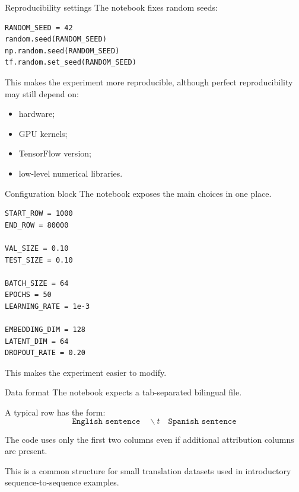 \documentclass[aspectratio=169]{beamer}
\begin{document}
\begin{frame}[fragile]{Reproducibility settings}
The notebook fixes random seeds:

\begin{lstlisting}
RANDOM_SEED = 42
random.seed(RANDOM_SEED)
np.random.seed(RANDOM_SEED)
tf.random.set_seed(RANDOM_SEED)
\end{lstlisting}

\vspace{0.2cm}
This makes the experiment more reproducible, although perfect reproducibility may still depend on:
\begin{itemize}
    \item hardware;
    \item GPU kernels;
    \item TensorFlow version;
    \item low-level numerical libraries.
\end{itemize}
\end{frame}
%
%
\begin{frame}[fragile]{Configuration block}
The notebook exposes the main choices in one place.

\begin{lstlisting}
START_ROW = 1000
END_ROW = 80000

VAL_SIZE = 0.10
TEST_SIZE = 0.10

BATCH_SIZE = 64
EPOCHS = 50
LEARNING_RATE = 1e-3

EMBEDDING_DIM = 128
LATENT_DIM = 64
DROPOUT_RATE = 0.20
\end{lstlisting}

This makes the experiment easier to modify.
\end{frame}
%
%
\begin{frame}[fragile]{Data format}
The notebook expects a tab-separated bilingual file.

\vspace{0.3cm}
A typical row has the form:
\[
\texttt{English sentence} \quad \backslash t \quad \texttt{Spanish sentence}
\]

\vspace{0.3cm}
The code uses only the first two columns even if additional attribution columns are present.

\vspace{0.3cm}
This is a common structure for small translation datasets used in introductory sequence-to-sequence examples.
\end{frame}
\end{document}
